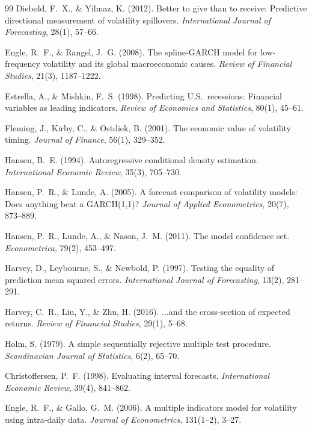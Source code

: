 \documentclass[12pt,a4paper]{article}
\begin{document}
\begin{thebibliography}{99}
Diebold, F.~X., \& Yilmaz, K. (2012). Better to give than to receive: Predictive directional measurement of volatility spillovers. \textit{International Journal of Forecasting}, 28(1), 57--66.

Engle, R.~F., \& Rangel, J.~G. (2008). The spline-GARCH model for low-frequency volatility and its global macroeconomic causes. \textit{Review of Financial Studies}, 21(3), 1187--1222.

Estrella, A., \& Mishkin, F.~S. (1998). Predicting U.S.\ recessions: Financial variables as leading indicators. \textit{Review of Economics and Statistics}, 80(1), 45--61.

Fleming, J., Kirby, C., \& Ostdiek, B. (2001). The economic value of volatility timing. \textit{Journal of Finance}, 56(1), 329--352.

Hansen, B.~E. (1994). Autoregressive conditional density estimation. \textit{International Economic Review}, 35(3), 705--730.

Hansen, P.~R., \& Lunde, A. (2005). A forecast comparison of volatility models: Does anything beat a GARCH(1,1)? \textit{Journal of Applied Econometrics}, 20(7), 873--889.

Hansen, P.~R., Lunde, A., \& Nason, J.~M. (2011). The model confidence set. \textit{Econometrica}, 79(2), 453--497.

Harvey, D., Leybourne, S., \& Newbold, P. (1997). Testing the equality of prediction mean squared errors. \textit{International Journal of Forecasting}, 13(2), 281--291.

Harvey, C.~R., Liu, Y., \& Zhu, H. (2016). ...and the cross-section of expected returns. \textit{Review of Financial Studies}, 29(1), 5--68.

Holm, S. (1979). A simple sequentially rejective multiple test procedure. \textit{Scandinavian Journal of Statistics}, 6(2), 65--70.

Christoffersen, P.~F. (1998). Evaluating interval forecasts. \textit{International Economic Review}, 39(4), 841--862.

Engle, R.~F., \& Gallo, G.~M. (2006). A multiple indicators model for volatility using intra-daily data. \textit{Journal of Econometrics}, 131(1--2), 3--27.


\end{thebibliography}
\end{document}
